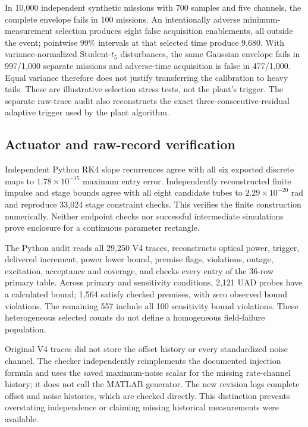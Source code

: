 In 10,000 independent synthetic missions with 700 samples and five channels, the complete envelope fails in 100 missions. An intentionally adverse minimum-measurement selection produces eight false acquisition enablements, all outside the event; pointwise 99\% intervals at that selected time produce 9,680. With variance-normalized Student-$t_5$ disturbances, the same Gaussian envelope fails in 997/1,000 separate missions and adverse-time acquisition is false in 477/1,000. Equal variance therefore does not justify transferring the calibration to heavy tails. These are illustrative selection stress tests, not the plant's trigger. The separate raw-trace audit also reconstructs the exact three-consecutive-residual adaptive trigger used by the plant algorithm.

\subsection{Actuator and raw-record verification}
Independent Python RK4 slope recurrences agree with all six exported discrete maps to $1.78\times10^{-15}$ maximum entry error. Independently reconstructed finite impulse and stage bounds agree with all eight candidate tubes to $2.29\times10^{-20}$ rad and reproduce 33,024 stage constraint checks. This verifies the finite construction numerically. Neither endpoint checks nor successful intermediate simulations prove enclosure for a continuous parameter rectangle.

The Python audit reads all 29,250 V4 traces, reconstructs optical power, trigger, delivered increment, power lower bound, premise flags, violations, outage, excitation, acceptance and coverage, and checks every entry of the 36-row primary table. Across primary and sensitivity conditions, 2,121 UAD probes have a calculated bound; 1,564 satisfy checked premises, with zero observed bound violations. The remaining 557 include all 100 sensitivity bound violations. These heterogeneous selected counts do not define a homogeneous field-failure population.

Original V4 traces did not store the offset history or every standardized noise channel. The checker independently reimplements the documented injection formula and uses the saved maximum-noise scalar for the missing rate-channel history; it does not call the MATLAB generator. The new revision logs complete offset and noise histories, which are checked directly. This distinction prevents overstating independence or claiming missing historical measurements were available.



